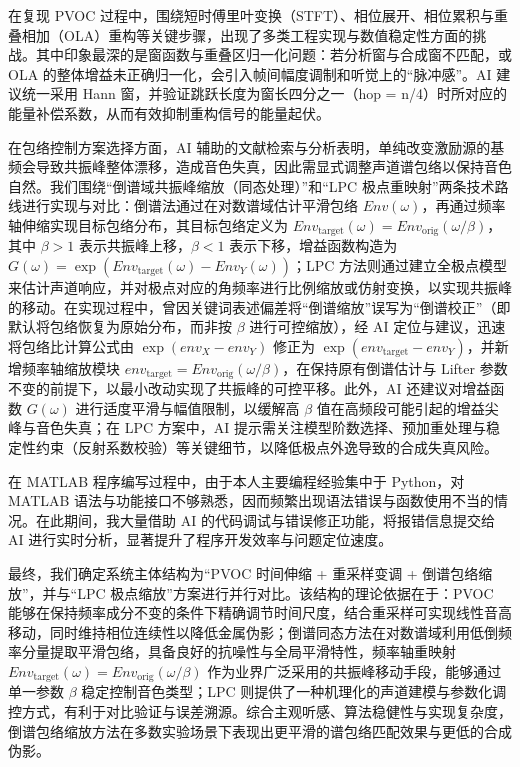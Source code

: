 \documentclass[12pt,a4paper]{article}
\begin{document}
在复现 PVOC 过程中，围绕短时傅里叶变换（STFT）、相位展开、相位累积与重叠相加（OLA）重构等关键步骤，出现了多类工程实现与数值稳定性方面的挑战。其中印象最深的是窗函数与重叠区归一化问题：若分析窗与合成窗不匹配，或 OLA 的整体增益未正确归一化，会引入帧间幅度调制和听觉上的“脉冲感”。AI 建议统一采用 Hann 窗，并验证跳跃长度为窗长四分之一（hop = n/4）时所对应的能量补偿系数，从而有效抑制重构信号的能量起伏。

在包络控制方案选择方面，AI 辅助的文献检索与分析表明，单纯改变激励源的基频会导致共振峰整体漂移，造成音色失真，因此需显式调整声道谱包络以保持音色自然。我们围绕“倒谱域共振峰缩放（同态处理）”和“LPC 极点重映射”两条技术路线进行实现与对比：倒谱法通过在对数谱域估计平滑包络 $Env(\omega)$，再通过频率轴伸缩实现目标包络分布，其目标包络定义为 $Env_{\text{target}}(\omega) = Env_{\text{orig}}(\omega/\beta)$，其中 $\beta > 1$ 表示共振峰上移，$\beta < 1$ 表示下移，增益函数构造为 $G(\omega) = \exp\left(Env_{\text{target}}(\omega) - Env_Y(\omega)\right)$；LPC 方法则通过建立全极点模型来估计声道响应，并对极点对应的角频率进行比例缩放或仿射变换，以实现共振峰的移动。在实现过程中，曾因关键词表述偏差将“倒谱缩放”误写为“倒谱校正”（即默认将包络恢复为原始分布，而非按 $\beta$ 进行可控缩放），经 AI 定位与建议，迅速将包络比计算公式由 $\exp(env_X - env_Y)$ 修正为 $\exp(env_{\text{target}} - env_Y)$，并新增频率轴缩放模块 $env_{\text{target}} = Env_{\text{orig}}(\omega/\beta)$，在保持原有倒谱估计与 Lifter 参数不变的前提下，以最小改动实现了共振峰的可控平移。此外，AI 还建议对增益函数 $G(\omega)$ 进行适度平滑与幅值限制，以缓解高 $\beta$ 值在高频段可能引起的增益尖峰与音色失真；在 LPC 方案中，AI 提示需关注模型阶数选择、预加重处理与稳定性约束（反射系数校验）等关键细节，以降低极点外逸导致的合成失真风险。

在 MATLAB 程序编写过程中，由于本人主要编程经验集中于 Python，对 MATLAB 语法与功能接口不够熟悉，因而频繁出现语法错误与函数使用不当的情况。在此期间，我大量借助 AI 的代码调试与错误修正功能，将报错信息提交给 AI 进行实时分析，显著提升了程序开发效率与问题定位速度。

最终，我们确定系统主体结构为“PVOC 时间伸缩 + 重采样变调 + 倒谱包络缩放”，并与“LPC 极点缩放”方案进行并行对比。该结构的理论依据在于：PVOC 能够在保持频率成分不变的条件下精确调节时间尺度，结合重采样可实现线性音高移动，同时维持相位连续性以降低金属伪影；倒谱同态方法在对数谱域利用低倒频率分量提取平滑包络，具备良好的抗噪性与全局平滑特性，频率轴重映射 $Env_{\text{target}}(\omega) = Env_{\text{orig}}(\omega/\beta)$ 作为业界广泛采用的共振峰移动手段，能够通过单一参数 $\beta$ 稳定控制音色类型；LPC 则提供了一种机理化的声道建模与参数化调控方式，有利于对比验证与误差溯源。综合主观听感、算法稳健性与实现复杂度，倒谱包络缩放方法在多数实验场景下表现出更平滑的谱包络匹配效果与更低的合成伪影。
\end{document}
